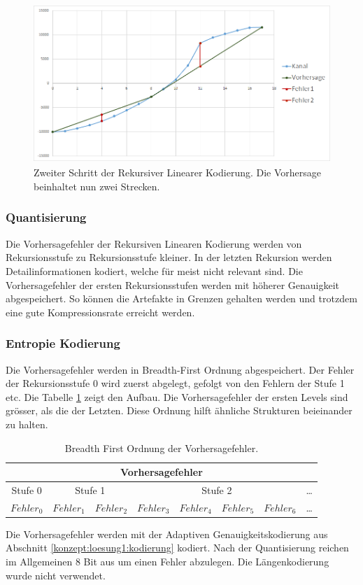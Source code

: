 \begin{figure}[!htbp]
	\center
	\includegraphics[width=1\textwidth,height=6cm,keepaspectratio]{./pictures/konzept/solution2/algorithm_step2.png}
	\caption{Zweiter Schritt der Rekursiver Linearer Kodierung. Die Vorhersage beinhaltet nun zwei Strecken.}
	\label{konzept:loesung2:algorithm:step2}
\end{figure} 

\subsubsection{Quantisierung} \label{konzept:loesung2:resudial_quant}
Die Vorhersagefehler der Rekursiven Linearen Kodierung werden von Rekursionsstufe zu Rekursionsstufe kleiner. In der letzten Rekursion werden Detailinformationen kodiert, welche für meist nicht relevant sind. Die Vorhersagefehler der ersten Rekursionsstufen werden mit höherer Genauigkeit abgespeichert. So können die Artefakte in Grenzen gehalten werden und trotzdem eine gute Kompressionsrate erreicht werden.

\subsubsection{Entropie Kodierung}
Die Vorhersagefehler werden in Breadth-First Ordnung abgespeichert. Der Fehler der Rekursionsstufe 0 wird zuerst abgelegt, gefolgt von den Fehlern der Stufe 1 etc. Die Tabelle \ref{konzept:loesung2:entropie:breath} zeigt den Aufbau. Die Vorhersagefehler der ersten Levels sind grösser, als die der Letzten. Diese Ordnung hilft ähnliche Strukturen beieinander zu halten.

\begin{table}[!htbp]
	\center
	\begin{tabular}{|c||c|c||c|c|c|c||c}
		\hline
		\multicolumn{8}{|c|}{Vorhersagefehler}\\\hline\hline
		 Stufe 0& \multicolumn{2}{|c||}{Stufe 1} & \multicolumn{4}{|c|}{Stufe 2} &\ldots \\\hline
		$Fehler_0$ & $Fehler_1$ &$Fehler_2$ &$Fehler_3$ & $Fehler_4$ & $Fehler_5$ & $Fehler_6$   & \ldots \\\hline
	\end{tabular}
	\caption{Breadth First Ordnung der Vorhersagefehler.}
	\label{konzept:loesung2:entropie:breath}
\end{table}
Die Vorhersagefehler werden mit der Adaptiven Genauigkeitskodierung aus Abschnitt \ref{konzept:loesung1:kodierung} kodiert. Nach der Quantisierung reichen im Allgemeinen 8 Bit aus um einen Fehler abzulegen. Die Längenkodierung wurde nicht verwendet.